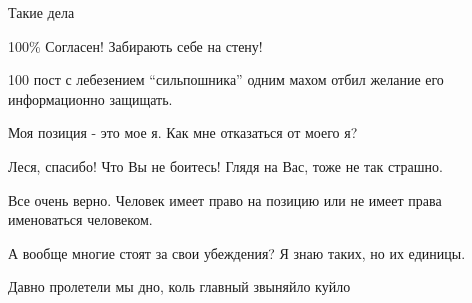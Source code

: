 Такие дела

\begin{itemize}
100\% Согласен! Забирають себе на стену!

100%
пост с лебезением \enquote{сильпошника} одним махом отбил желание его информационно защищать.

Моя позиция - это мое я. Как мне отказаться от моего я?

Леся, спасибо! Что Вы не боитесь! Глядя на Вас, тоже не так страшно.

Все очень верно. Человек имеет право на позицию или не имеет права именоваться человеком.

А вообще многие стоят за свои убеждения? Я знаю таких, но их единицы.

Давно пролетели мы дно,
коль главный звыняйло куйло
\end{itemize}
